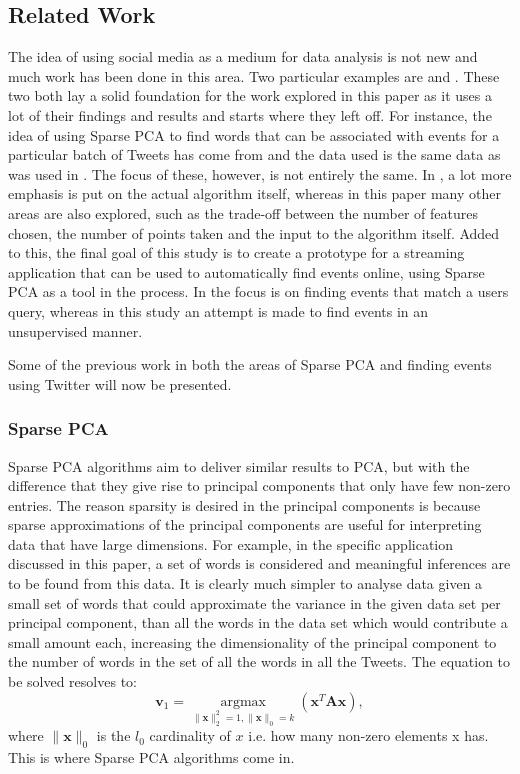 \documentclass[11pt,a4paper]{article}
\begin{document}
\subsection{Related Work}
The idea of using social media as a medium for data analysis is not new and much work has been done in this area. Two particular examples are \cite{dimakis} and \cite{microblogs}. These two both lay a solid foundation for the work explored in this paper as it uses a lot of their findings and results and starts where they left off. For instance, the idea of using Sparse PCA to find words that can be associated with events for a particular batch of Tweets has come from \cite{dimakis} and the data used is the same data as was used in \cite{microblogs}. The focus of these, however, is not entirely the same. In \cite{dimakis}, a lot more emphasis is put on the actual algorithm itself, whereas in this paper many other areas are also explored, such as the trade-off between the number of features chosen, the number of points taken and the input to the algorithm itself. Added to this, the final goal of this study is to create a prototype for a streaming application that can be used to automatically find events online, using Sparse PCA as a tool in the process. In \cite{microblogs} the focus is on finding events that match a users query, whereas in this study an attempt is made to find events in an unsupervised manner.

Some of the previous work in both the areas of Sparse PCA and finding events using Twitter will now be presented.

\subsubsection{Sparse PCA}

Sparse PCA algorithms aim to deliver similar results to PCA, but with the difference that they give rise to principal components that only have few non-zero entries. The reason sparsity is desired in the principal components is because sparse approximations of the principal components are useful for interpreting data that have large dimensions. For example, in the specific application discussed in this paper, a set of words is considered and meaningful inferences are to be found from this data. It is clearly much simpler to analyse data given a small set of words that could approximate the variance in the given data set per principal component, than all the words in the data set which would contribute a small amount each, increasing the dimensionality of the principal component to the number of words in the set of all the words in all the Tweets. The equation to be solved resolves to:
\begin{equation}
\mathbf{v}_1 = \underset{\|\mathbf{x}\|_2^2 = 1, \|\mathbf{x}\|_0 = k}{\operatorname{argmax}}\left( \mathbf{x}^T\mathbf{A}\mathbf{x}\right),
\end{equation}
where $\|\mathbf{x}\|_0$ is the $l_0$ cardinality of $x$ i.e. how many non-zero elements x has. This is where Sparse PCA algorithms come in. 
\end{document}
